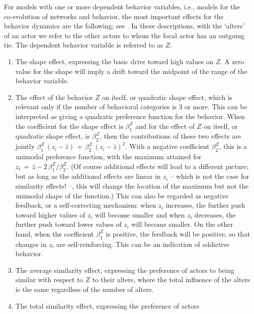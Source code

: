 \documentclass[a4paper,fleqn]{article}
\newcommand{\+}{\, + \,}
\begin{document}
{For models with one or more dependent behavior variables, i.e.,
models for the co-evolution of networks and behavior,
the most important effects for the behavior dynamics are the following;
see \citet*{SteglichEA10}.
In these descriptions, with the `alters' of an actor
we refer to the other actors to whom
the focal actor has an outgoing tie.
The dependent behavior variable is referred to as $Z$.
\begin{enumerate}
\item The shape effect, expressing the basic drive toward high values on $Z$.
      A zero value for the shape will imply a drift toward the midpoint
      of the range of the behavior variable.
\item The effect of the behavior $Z$ on itself,
      or quadratic shape effect, which is relevant
      only if the number of behavioral categories is 3 or more.
      This can be interpreted as giving a quadratic preference function
      for the behavior.
      When the coefficient for the shape effect is $\beta^Z_1$ and for the
      effect of $Z$ on itself, or quadratic shape effect, is $\beta^Z_2$,
      then the contributions
      of these two effects are jointly $\beta^Z_1\, (z_i - \bar z) \,+\,
                   \beta^Z_2\, (z_i - \bar z)^2$.
      With a negative coefficient $\beta^Z_2$, this
      is a unimodal preference function, with the maximum attained
      for $z_i \,=\, \bar z - 2\,\beta^Z_1/\beta^Z_2$.
      (Of course additional effects will lead to a different picture;
      but as long as the additional effects are linear in $z_i$ -- which is not
      the case for similarity effects! --, this will change the location of the maximum
      but not the unimodal shape of the function.)
      This can also be regarded as negative feedback, or a self-correcting
      mechanism: when $z_i$ increases, the further push toward higher values
      of $z_i$ will become smaller and when $z_i$ decreases, the further push toward lower values
      of $z_i$ will become smaller. On the other hand, when the coefficient $\beta^Z_2$
      is positive, the feedback will be positive, so that changes in $z_i$
      are self-reinforcing. This can be an indication of addictive behavior.
\item The average similarity effect, expressing the preference of actors
      to being similar with respect to $Z$ to their alters,
      where the total influence of the alters is the same
      regardless of the number of alters.
\item The total similarity effect, expressing the preference of actors

\end{enumerate}}
\end{document}
